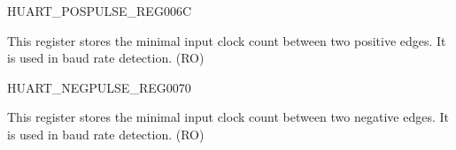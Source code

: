\begin{register}{H}{UART\_POSPULSE\_REG}{\hexprefix{}006C}\label{regdesc:UARTPOSPULSEREG}
%
%
\regnewline%
\begin{regdesc}\begin{reglist}
\label{fielddesc:UARTPOSEDGEMINCNT}\item [UART\_POSEDGE\_MIN\_CNT] This register stores the minimal input clock count between two positive edges. It is used in baud rate detection. (RO)
\end{reglist}\end{regdesc}
\end{register}


\begin{register}{H}{UART\_NEGPULSE\_REG}{\hexprefix{}0070}\label{regdesc:UARTNEGPULSEREG}
%
%
\regnewline%
\begin{regdesc}\begin{reglist}
\label{fielddesc:UARTNEGEDGEMINCNT}\item [UART\_NEGEDGE\_MIN\_CNT] This register stores the minimal input clock count between two negative edges. It is used in baud rate detection. (RO)
\end{reglist}\end{regdesc}
\end{register}


